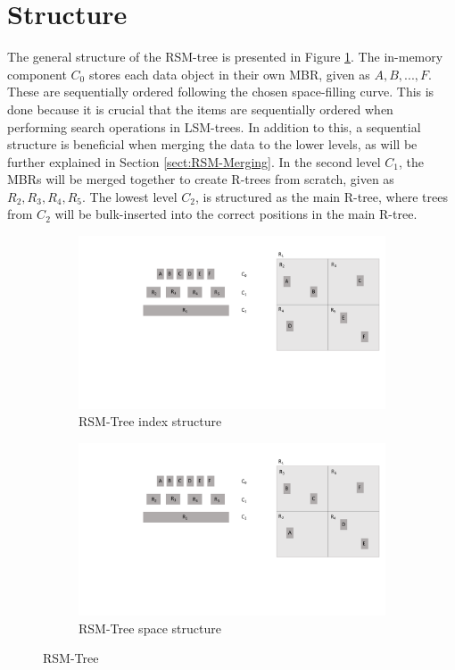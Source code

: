 \section{Structure}
The general structure of the RSM-tree is presented in Figure \ref{fig:RSMTree}. The in-memory component $C_0$ stores each data object in their own MBR, given as $A, B, ..., F$. These are sequentially ordered following the chosen space-filling curve. This is done because it is crucial that the items are sequentially ordered when performing search operations in LSM-trees. In addition to this, a sequential structure is beneficial when merging the data to the lower levels, as will be further explained in Section \ref{sect:RSM-Merging}. In the second level $C_1$, the MBRs will be merged together to create R-trees from scratch, given as $R_2, R_3, R_4, R_5$. The lowest level $C_2$, is structured as the main R-tree, where trees from $C_2$ will be bulk-inserted into the correct positions in the main R-tree.  
\begin{figure}[ht]
     \centering
     \begin{subfigure}{0.45\textwidth}
         \centering
         \includegraphics[width=\textwidth]{figures/RSMTree.pdf}
         \caption{RSM-Tree index structure}
     \end{subfigure}
     \hfill
     \begin{subfigure}{0.45\textwidth}
         \centering
         \includegraphics[width=\textwidth]{figures/RSMTree_space.pdf}
         \caption{RSM-Tree space structure}
     \end{subfigure}
        \caption{RSM-Tree}
        \label{fig:RSMTree}
\end{figure}

